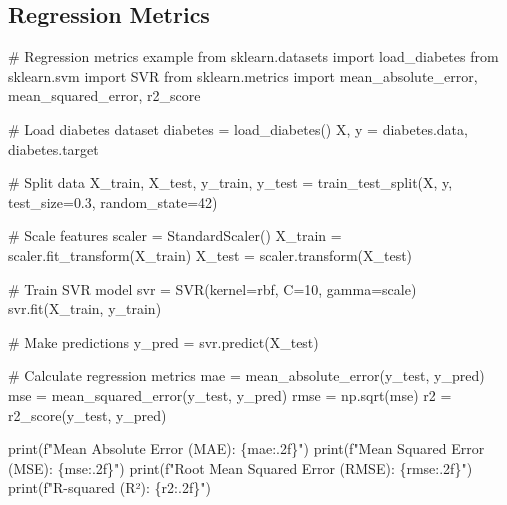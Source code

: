 \documentclass[
  letterpaper,
  DIV=11,
  numbers=noendperiod]{scrreprt}
\newenvironment{Shaded}{\begin{snugshade}}{\end{snugshade}}
\newcommand{\BuiltInTok}[1]{\textcolor[rgb]{0.00,0.23,0.31}{#1}}
\newcommand{\CommentTok}[1]{\textcolor[rgb]{0.37,0.37,0.37}{#1}}
\newcommand{\DecValTok}[1]{\textcolor[rgb]{0.68,0.00,0.00}{#1}}
\newcommand{\FloatTok}[1]{\textcolor[rgb]{0.68,0.00,0.00}{#1}}
\newcommand{\ImportTok}[1]{\textcolor[rgb]{0.00,0.46,0.62}{#1}}
\newcommand{\NormalTok}[1]{\textcolor[rgb]{0.00,0.23,0.31}{#1}}
\newcommand{\OperatorTok}[1]{\textcolor[rgb]{0.37,0.37,0.37}{#1}}
\newcommand{\SpecialCharTok}[1]{\textcolor[rgb]{0.37,0.37,0.37}{#1}}
\newcommand{\SpecialStringTok}[1]{\textcolor[rgb]{0.13,0.47,0.30}{#1}}
\newcommand{\StringTok}[1]{\textcolor[rgb]{0.13,0.47,0.30}{#1}}
\begin{document}
\subsection{Regression Metrics}\label{regression-metrics}

\begin{Shaded}
\begin{Highlighting}[]
\CommentTok{\# Regression metrics example}
\ImportTok{from}\NormalTok{ sklearn.datasets }\ImportTok{import}\NormalTok{ load\_diabetes}
\ImportTok{from}\NormalTok{ sklearn.svm }\ImportTok{import}\NormalTok{ SVR}
\ImportTok{from}\NormalTok{ sklearn.metrics }\ImportTok{import}\NormalTok{ mean\_absolute\_error, mean\_squared\_error, r2\_score}

\CommentTok{\# Load diabetes dataset}
\NormalTok{diabetes }\OperatorTok{=}\NormalTok{ load\_diabetes()}
\NormalTok{X, y }\OperatorTok{=}\NormalTok{ diabetes.data, diabetes.target}

\CommentTok{\# Split data}
\NormalTok{X\_train, X\_test, y\_train, y\_test }\OperatorTok{=}\NormalTok{ train\_test\_split(X, y, test\_size}\OperatorTok{=}\FloatTok{0.3}\NormalTok{, random\_state}\OperatorTok{=}\DecValTok{42}\NormalTok{)}

\CommentTok{\# Scale features}
\NormalTok{scaler }\OperatorTok{=}\NormalTok{ StandardScaler()}
\NormalTok{X\_train }\OperatorTok{=}\NormalTok{ scaler.fit\_transform(X\_train)}
\NormalTok{X\_test }\OperatorTok{=}\NormalTok{ scaler.transform(X\_test)}

\CommentTok{\# Train SVR model}
\NormalTok{svr }\OperatorTok{=}\NormalTok{ SVR(kernel}\OperatorTok{=}\StringTok{\textquotesingle{}rbf\textquotesingle{}}\NormalTok{, C}\OperatorTok{=}\DecValTok{10}\NormalTok{, gamma}\OperatorTok{=}\StringTok{\textquotesingle{}scale\textquotesingle{}}\NormalTok{)}
\NormalTok{svr.fit(X\_train, y\_train)}

\CommentTok{\# Make predictions}
\NormalTok{y\_pred }\OperatorTok{=}\NormalTok{ svr.predict(X\_test)}

\CommentTok{\# Calculate regression metrics}
\NormalTok{mae }\OperatorTok{=}\NormalTok{ mean\_absolute\_error(y\_test, y\_pred)}
\NormalTok{mse }\OperatorTok{=}\NormalTok{ mean\_squared\_error(y\_test, y\_pred)}
\NormalTok{rmse }\OperatorTok{=}\NormalTok{ np.sqrt(mse)}
\NormalTok{r2 }\OperatorTok{=}\NormalTok{ r2\_score(y\_test, y\_pred)}

\BuiltInTok{print}\NormalTok{(}\SpecialStringTok{f"Mean Absolute Error (MAE): }\SpecialCharTok{\{}\NormalTok{mae}\SpecialCharTok{:.2f\}}\SpecialStringTok{"}\NormalTok{)}
\BuiltInTok{print}\NormalTok{(}\SpecialStringTok{f"Mean Squared Error (MSE): }\SpecialCharTok{\{}\NormalTok{mse}\SpecialCharTok{:.2f\}}\SpecialStringTok{"}\NormalTok{)}
\BuiltInTok{print}\NormalTok{(}\SpecialStringTok{f"Root Mean Squared Error (RMSE): }\SpecialCharTok{\{}\NormalTok{rmse}\SpecialCharTok{:.2f\}}\SpecialStringTok{"}\NormalTok{)}
\BuiltInTok{print}\NormalTok{(}\SpecialStringTok{f"R{-}squared (R²): }\SpecialCharTok{\{}\NormalTok{r2}\SpecialCharTok{:.2f\}}\SpecialStringTok{"}\NormalTok{)}


\end{Highlighting}
\end{Shaded}
\end{document}
